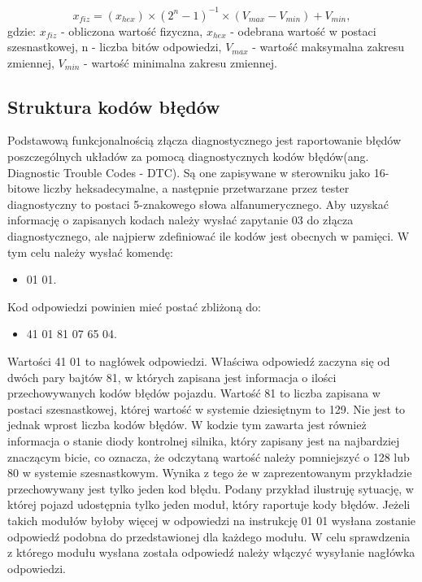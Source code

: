 \documentclass[12pt]{article} %
\numberwithin{equation}{subsection}
\numberwithin{figure}{section}
\numberwithin{table}{section}
\begin{document}
	\begin{equation}
	x_{fiz} = (x_{hex}) \times {(2^n-1)}^{-1} \times (V_{max} - V_{min}) + V_{min},
	\end{equation}			
	gdzie: $x_{fiz}$ - obliczona wartość fizyczna, $x_{hex}$ - odebrana wartość w postaci szesnastkowej, n - liczba bitów odpowiedzi, $V_{max}$ - wartość maksymalna zakresu zmiennej, $V_{min}$ - wartość minimalna zakresu zmiennej.
		
		\newpage
		
		\subsection{Struktura kodów błędów}
		
		\hspace{0.5cm}Podstawową funkcjonalnością złącza diagnostycznego jest raportowanie błędów poszczególnych układów za pomocą diagnostycznych kodów błędów(ang. Diagnostic Trouble Codes - DTC). Są one zapisywane w sterowniku jako 16-bitowe liczby heksadecymalne, a następnie przetwarzane przez tester diagnostyczny to postaci 5-znakowego słowa alfanumerycznego. Aby uzyskać informację o zapisanych kodach należy wysłać zapytanie 03 do złącza diagnostycznego, ale najpierw zdefiniować ile kodów jest obecnych w pamięci. W tym celu należy wysłać komendę:
		
		\begin{itemize}
			\item{01 01.}
		\end{itemize}
		Kod odpowiedzi powinien mieć postać zbliżoną do: 

		\begin{itemize}
			\item{41 01 81 07 65 04.}
		\end{itemize}
		
		Wartości 41 01 to nagłówek odpowiedzi. Właściwa odpowiedź zaczyna się od dwóch pary bajtów 81, w których zapisana jest informacja o ilości przechowywanych kodów błędów pojazdu. Wartość 81 to liczba zapisana w postaci szesnastkowej, której wartość w systemie dziesiętnym to 129. Nie jest to jednak wprost liczba kodów błędów. W kodzie tym zawarta jest również informacja o stanie diody kontrolnej silnika, który zapisany jest na najbardziej znaczącym bicie, co oznacza, że odczytaną wartość należy pomniejszyć o 128 lub 80 w systemie szesnastkowym. Wynika z tego że w zaprezentowanym przykładzie przechowywany jest tylko jeden kod błędu. Podany przykład ilustruję sytuację, w której pojazd udostępnia tylko jeden moduł, który raportuje kody błędów. Jeżeli takich modułów byłoby więcej w odpowiedzi na instrukcję 01 01 wysłana zostanie odpowiedź podobna do przedstawionej dla każdego modułu. W celu sprawdzenia z którego modułu wysłana została odpowiedź należy włączyć wysyłanie nagłówka odpowiedzi.
		
\end{document}
